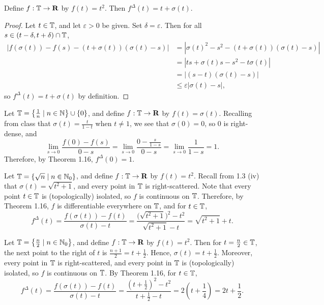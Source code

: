 \documentclass[nonumber]{homework}
\begin{document}
	
	Define $f : \mathbb{T} \to \textnormal{\bf R}$ by $f(t) = t^2$. Then $f^\Delta(t) = t + \sigma(t)$.
	
	\begin{proof}
		Let $t \in \mathbb{T}$, and let $\varepsilon > 0$ be given. Set $\delta = \varepsilon$. Then for all $s \in (t-\delta, t+\delta) \cap \mathbb{T}$,
		\begin{align*}
			|f(\sigma(t)) - f(s) - (t+\sigma(t))(\sigma(t) - s)| &= |\sigma(t)^2 - s^2 - (t+\sigma(t))(\sigma(t)-s)| \\
			&= |ts + \sigma(t)s - s^2-t\sigma(t)| \\
			&= |(s-t)(\sigma(t) - s)| \\
			&\le \varepsilon|\sigma(t)-s|,
		\end{align*}
		so $f^\Delta(t) = t + \sigma(t)$ by definition.
	\end{proof}
	
	
	Let $\mathbb{T} = \left\{\frac{1}{n} \mid n \in \mathbb{N}\right\} \cup \{0\}$, and define $f : \mathbb{T} \to \textnormal{\bf R}$ by $f(t) = \sigma(t)$. Recalling from class that $\sigma(t) = \frac{t}{1-t}$ when $t \ne 1$, we see that $\sigma(0) = 0$, so $0$ is right-dense, and
	\begin{equation*}
		\lim_{s\to 0} \frac{f(0) - f(s)}{0-s} = \lim_{s\to 0} \frac{0 - \frac{s}{1-s}}{0-s} = \lim_{s\to 0}\frac{1}{1-s} = 1.
	\end{equation*}
	Therefore, by Theorem 1.16, $f^\Delta(0) = 1$.
	
	Let $\mathbb{T} = \{\sqrt{n} \mid n \in \mathbb{N}_0\}$, and define $f : \mathbb{T} \to \textnormal{\bf R}$ by $f(t) = t^2$. Recall from 1.3 (iv) that $\sigma(t) = \sqrt{t^2+1}$, and every point in $\mathbb{T}$ is right-scattered. Note that every point $t \in \mathbb{T}$ is (topologically) isolated, so $f$ is continuous on $\mathbb{T}$. Therefore, by Theorem 1.16, $f$ is differentiable everywhere on $\mathbb{T}$, and for $t \in \mathbb{T}$,
	\begin{equation*}
		f^\Delta(t) = \frac{f(\sigma(t)) - f(t)}{\sigma(t) - t} = \frac{\big(\sqrt{t^2+1}\big)^2 - t^2}{\sqrt{t^2+1} - t} = \sqrt{t^2+1} + t.
	\end{equation*}
	
	Let $\mathbb{T} = \left\{\frac{n}{2} \mid n \in \mathbb{N}_0\right\}$, and define $f:\mathbb{T} \to\textnormal{\bf R}$ by $f(t) = t^2$. Then for $t = \frac{n}{2} \in \mathbb{T}$, the next point to the right of $t$ is $\frac{n+1}{2} = t + \frac{1}{2}$. Hence, $\sigma(t) = t + \frac{1}{2}$. Moreover, every point in $\mathbb{T}$ is right-scattered, and every point in $\mathbb{T}$ is (topologically) isolated, so $f$ is continuous on $\mathbb{T}$. By Theorem 1.16, for $t \in \mathbb{T}$,
	\begin{equation*}
		f^\Delta(t) = \frac{f(\sigma(t)) - f(t)}{\sigma(t) - t} = \frac{\left(t+\frac{1}{2}\right)^2 - t^2}{t+\frac{1}{2} - t} = 2\left(t+\frac{1}{4}\right) = 2t + \frac{1}{2}.
	\end{equation*}
	
\end{document}
